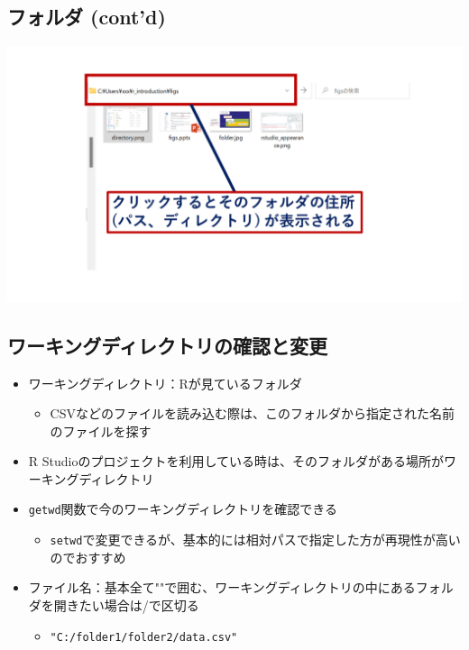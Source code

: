 \documentclass[
]{ltjsarticle}
\providecommand{\tightlist}{%
  \setlength{\itemsep}{0pt}\setlength{\parskip}{0pt}}
\begin{document}
\hypertarget{ux30d5ux30a9ux30ebux30c0-contd}{%
\subsection{フォルダ (cont'd)}\label{ux30d5ux30a9ux30ebux30c0-contd}}

\begin{center}\includegraphics[width=0.95\linewidth]{figs/directory_system2} \end{center}

\hypertarget{ux30efux30fcux30adux30f3ux30b0ux30c7ux30a3ux30ecux30afux30c8ux30eaux306eux78baux8a8dux3068ux5909ux66f4}{%
\subsection{ワーキングディレクトリの確認と変更}\label{ux30efux30fcux30adux30f3ux30b0ux30c7ux30a3ux30ecux30afux30c8ux30eaux306eux78baux8a8dux3068ux5909ux66f4}}

\begin{itemize}
\tightlist
\item
  ワーキングディレクトリ：Rが見ているフォルダ

  \begin{itemize}
  \tightlist
  \item
    CSVなどのファイルを読み込む際は、このフォルダから指定された名前のファイルを探す
  \end{itemize}
\item
  R
  Studioのプロジェクトを利用している時は、そのフォルダがある場所がワーキングディレクトリ
\item
  \texttt{getwd}関数で今のワーキングディレクトリを確認できる

  \begin{itemize}
  \tightlist
  \item
    \texttt{setwd}で変更できるが、基本的には相対パスで指定した方が再現性が高いのでおすすめ
  \end{itemize}
\item
  ファイル名：基本全て""で囲む、ワーキングディレクトリの中にあるフォルダを開きたい場合は/で区切る

  \begin{itemize}
  \tightlist
  \item
    \texttt{"C:/folder1/folder2/data.csv"}
  \end{itemize}
\end{itemize}
\end{document}
